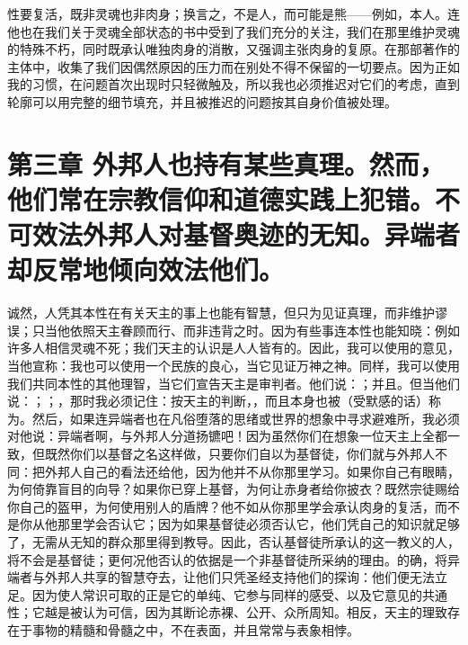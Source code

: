 性要复活，既非灵魂也非肉身；换言之，不是人，而可能是熊——例如，本人。连他也在我们关于灵魂全部状态的书中受到了我们充分的关注，我们在那里维护灵魂的特殊不朽，同时既承认唯独肉身的消散，又强调主张肉身的复原。在那部著作的主体中，收集了我们因偶然原因的压力而在别处不得不保留的一切要点。因为正如我的习惯，在问题首次出现时只轻微触及，所以我也必须推迟对它们的考虑，直到轮廓可以用完整的细节填充，并且被推迟的问题按其自身价值被处理。\par


\section{第三章  外邦人也持有某些真理。然而，他们常在宗教信仰和道德实践上犯错。不可效法外邦人对基督奥迹的无知。异端者却反常地倾向效法他们。}

诚然，人凭其本性在有关天主的事上也能有智慧，但只为见证真理，而非维护谬误；只当他依照天主眷顾而行、而非违背之时。因为有些事连本性也能知晓：例如许多人相信灵魂不死；我们天主的认识是人人皆有的。因此，我可以使用的意见，当他宣称：我也可以使用一个民族的良心，当它见证万神之神。同样，我可以使用我们共同本性的其他理智，当它们宣告天主是审判者。他们说：；并且。但当他们说：；；，那时我必须记住：按天主的判断，，而且本身也被（受默感的话）称为。然后，如果连异端者也在凡俗堕落的思绪或世界的想象中寻求避难所，我必须对他说：异端者啊，与外邦人分道扬镳吧！因为虽然你们在想象一位天主上全都一致，但既然你们以基督之名这样做，只要你们自以为基督徒，你们就与外邦人不同：把外邦人自己的看法还给他，因为他并不从你那里学习。如果你自己有眼睛，为何倚靠盲目的向导？如果你已穿上基督，为何让赤身者给你披衣？既然宗徒赐给你自己的盔甲，为何使用别人的盾牌？他不如从你那里学会承认肉身的复活，而不是你从他那里学会否认它；因为如果基督徒必须否认它，他们凭自己的知识就足够了，无需从无知的群众那里得到教导。因此，否认基督徒所承认的这一教义的人，将不会是基督徒；更何况他否认的依据是一个非基督徒所采纳的理由。的确，将异端者与外邦人共享的智慧夺去，让他们只凭圣经支持他们的探询：他们便无法立足。因为使人常识可取的正是它的单纯、它参与同样的感受、以及它意见的共通性；它越是被认为可信，因为其断论赤裸、公开、众所周知。相反，天主的理致存在于事物的精髓和骨髓之中，不在表面，并且常常与表象相悖。\par

